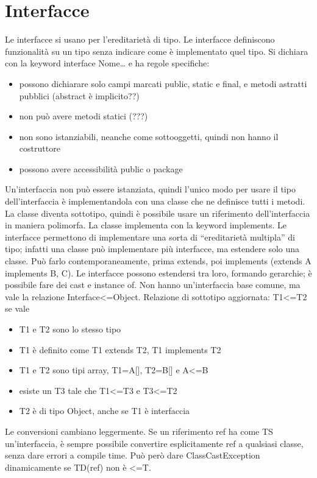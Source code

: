 \section{Interfacce}
Le interfacce si usano per l'ereditarietà di tipo. Le interfacce definiscono funzionalità su un tipo senza indicare come è implementato quel tipo. Si dichiara con la keyword interface Nome{…} e ha regole specifiche:
\begin{itemize}
\item possono dichiarare solo campi marcati public, static e final, e metodi astratti pubblici (abstract è implicito??)
\item non può avere metodi statici (???)
\item non sono istanziabili, neanche come sottooggetti, quindi non hanno il costruttore
\item possono avere accessibilità public o package
\end{itemize}
Un'interfaccia non può essere istanziata, quindi l'unico modo per usare il tipo dell'interfaccia è implementandola con una classe che ne definisce tutti i metodi. La classe diventa sottotipo, quindi è possibile usare un riferimento dell'interfaccia in maniera polimorfa. La classe implementa con la keyword implements. 
Le interfacce permettono di implementare una sorta di “ereditarietà multipla” di tipo; infatti una classe può implementare più interfacce, ma estendere solo una classe. Può farlo contemporaneamente, prima extends, poi implements (extends A implements B, C).
Le interfacce possono estendersi tra loro, formando gerarchie; è possibile fare dei cast e instance of. Non hanno un'interfaccia base comune, ma vale la relazione Interface<=Object.
Relazione di sottotipo aggiornata: T1<=T2 se vale
\begin{itemize}
\item T1 e T2 sono lo stesso tipo
\item T1 è definito come T1 extends T2, T1 implements T2
\item T1 e T2 sono tipi array, T1=A[], T2=B[] e A<=B
\item esiste un T3 tale che T1<=T3 e T3<=T2
\item T2 è di tipo Object, anche se T1 è interfaccia
\end{itemize}
Le conversioni cambiano leggermente. Se un riferimento ref ha come TS un'interfaccia, è sempre possibile convertire esplicitamente ref a qualsiasi classe, senza dare errori a compile time. Può però dare ClassCastException dinamicamente se TD(ref) non è <=T.

